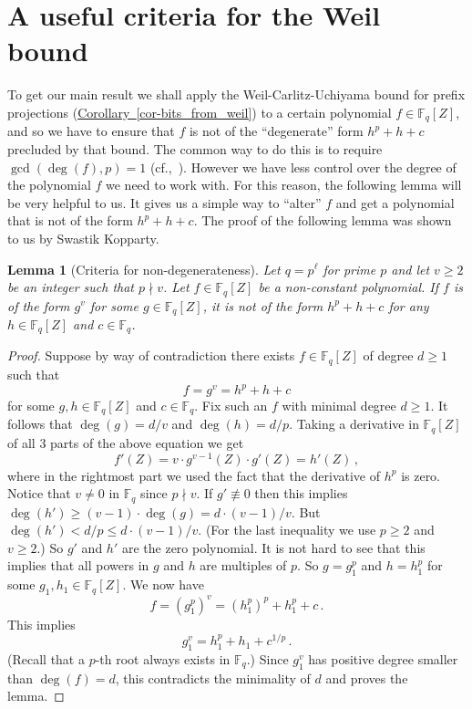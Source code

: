 \documentclass[10pt]{article}
\newtheorem{lemma}[theorem]{Lemma}
\theoremstyle{definition}
\numberwithin{equation}{section}
\newcommand{\expref}[2]{\texorpdfstring{\hyperref[#2]{#1~\ref{#2}}}{#1~\ref{#2}}}
\newcommand{\F}{\mathbb F_q}
\begin{document}
\section{A useful criteria for the Weil bound}\label{sec-weil}
To get our main result we shall apply the Weil-Carlitz-Uchiyama bound for prefix projections (\expref{Corollary}{cor-bits_from_weil}) to
a certain polynomial $f\in \F[Z]$, and so we have to ensure that $f$ is not of the
``degenerate'' form $h^p+h+c$ precluded by that bound. The common way
to do this is to require $\gcd(\deg(f),p) =1$ (cf.,~\cite{GR08,DG10}). However we have less control
%
over
the degree of the polynomial $f$ we need to work with.
For this reason, the following lemma will be very helpful to us.
It gives us a simple way to ``alter'' $f$ and get a polynomial that is not of the
form $h^p+ h+c$.
The proof of the following lemma was shown to us by Swastik Kopparty.
\begin{lemma}[Criteria for non-degenerateness]\label{lem-powerhelps}
Let $q=p^{\ell}$ for prime $p$ and let $v\geq 2$ be an integer such that $p\nmid v$.
Let $f\in \F[Z]$ be a non-constant polynomial. If $f$ is of the form $g^v$ for some $g\in \F[Z]$, it
is not of the form $h^p +h + c$ for any $h\in \F[Z]$ and $c\in \F$.
\end{lemma}
\begin{proof}
Suppose by way of contradiction there exists $f\in\F[Z]$ of degree $d\geq 1$
such that
\[f = g^v= h^p + h + c\]
 for some $g,h\in \F[Z]$ and $c\in \F$.
 Fix such an $f$ with minimal degree $d\geq 1$.
It follows that $\deg(g)= d/v$ and $\deg(h) = d/p$.
Taking a derivative in $\F[Z]$ of all 3 parts of the above equation we get
\[f'(Z) =  v\cdot g^{v-1}(Z)\cdot g'(Z)= h'(Z)\,,\]
where in the rightmost part we used the fact that the derivative of $h^p$ is zero.
Notice that $v\neq 0$ in $\F$ since $p\nmid v$.
%
%
If $g'\not\equiv 0$ then this implies $\deg(h') \geq (v-1)\cdot
\deg(g)= d \cdot{(v-1)}/{v}$.
%
%
%
%
%
%
%
%
 But $\deg(h') < d/p \le d\cdot {(v-1)}/{v}$.
 (For the last inequality we use $p\geq 2$ and $v\geq 2$.)
%
So $g'$ and $h'$ are the zero polynomial.
It is not hard to see that this implies that all powers in
$g$ and $h$ are multiples of $p$.
So $g= g_1^p$ and $h=h_1^p$ for some $g_1,h_1\in \F[Z]$.
We now have
\[f = (g_1^p)^v = (h_1^p)^p  + h_1^p + c\,.\]
This implies
\[ g_1^v = h_1^p + h_1 + c^{1/p}\,.\]
%
%
 (Recall that a $p$-th root always exists in $\F$.)
Since $g_1^v$ has positive degree smaller than $\deg(f)=d$, this contradicts the minimality of $d$ and proves the lemma.
\end{proof}
\noindent
\end{document}
